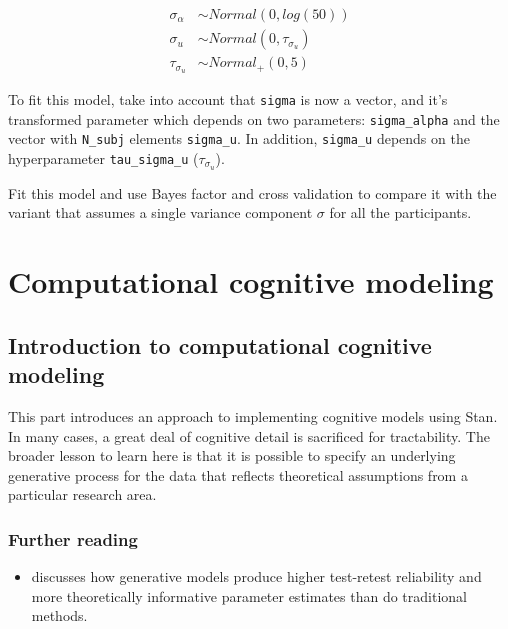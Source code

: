\documentclass[12pt,]{krantz}
\providecommand{\tightlist}{%
  \setlength{\itemsep}{0pt}\setlength{\parskip}{0pt}}
\theoremstyle{definition}
\theoremstyle{definition}
\theoremstyle{definition}
\theoremstyle{remark}
\begin{document}
\begin{equation}
\begin{aligned}
  \sigma_\alpha &\sim Normal(0,log(50))\\
  \sigma_u &\sim Normal(0, \tau_{\sigma_u}) \\
  \tau_{\sigma_u} &\sim Normal_+(0, 5)
\end{aligned}
\end{equation}

To fit this model, take into account that \texttt{sigma} is now a
vector, and it's transformed parameter which depends on two parameters:
\texttt{sigma\_alpha} and the vector with \texttt{N\_subj} elements
\texttt{sigma\_u}. In addition, \texttt{sigma\_u} depends on the
hyperparameter \texttt{tau\_sigma\_u} (\(\tau_{\sigma_u}\)).

Fit this model and use Bayes factor and cross validation to compare it
with the variant that assumes a single variance component \(\sigma\) for
all the participants.

\part{Computational cognitive
modeling}\label{part-computational-cognitive-modeling}

\chapter{Introduction to computational cognitive
modeling}\label{introduction-to-computational-cognitive-modeling}

This part introduces an approach to implementing cognitive models using
Stan. In many cases, a great deal of cognitive detail is sacrificed for
tractability. The broader lesson to learn here is that it is possible to
specify an underlying generative process for the data that reflects
theoretical assumptions from a particular research area.

\section{Further reading}\label{further-reading-10}

\begin{itemize}
\tightlist
\item
  \citet{haines2020learning} discusses how generative models produce
  higher test-retest reliability and more theoretically informative
  parameter estimates than do traditional methods.
\end{itemize}
\end{document}
